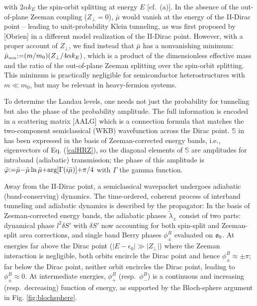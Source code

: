 \documentclass[aps, prb, showpacs, twocolumn, notitlepage, superscriptaddress]{revtex4-1}
\begin{document}
with $2\alpha k_E$ the spin-orbit splitting at energy $E$ [cf.\ (a)]. In the absence of the out-of-plane Zeeman coupling ($Z_\perp{=}0$), $\bar{\mu}$ would vanish at the energy of the II-Dirac point -- leading to unit-probability Klein tunneling, as was first proposed by [Obrien] in a different model realization of the II-Dirac point. However, with a proper account of $Z_\perp$, we find instead that $\bar{\mu}$ has a nonvanishing minimum: $\bar{\mu}_{\scriptscriptstyle{\text{min}}}{:}{=} ( m/m_0)(Z_\perp/4\alpha k_{E})$, which is a product of the dimensionless effective mass and the ratio of the out-of-plane Zeeman splitting over the spin-orbit splitting. This minimum is practically negligible for  semiconductor heterostructures with $m{\ll}m_0$, but may be relevant in heavy-fermion systems. 


To determine the Landau levels, one needs not just the probability for tunneling but also the phase of the probability amplitude. The full information is encoded in a scattering matrix [AALG]
which is a connection formula that matches the two-component semiclassical (WKB) wavefunction across the Dirac point. $\mathbb{S}$ in  has been expressed in the basis of Zeeman-corrected energy bands, i.e., eigenvectors of Eq. (\ref{calHRZ}), so the diagonal elements of $\mathbb{S}$ are amplitudes for intraband (adiabatic) transmission; the phase of this amplitude is $\bar{\varphi}{:}{=}\bar{\mu}{-}\bar{\mu}\ln\bar{\mu}{+}\text{arg}[\Gamma(i\bar{\mu})]{+}\pi/4$ with $\Gamma$ the gamma function.

Away from the II-Dirac point, a semiclassical wavepacket undergoes adiabatic (band-conserving) dynamics. The time-ordered, coherent process of interband tunneling and adiabatic dynamics is described by the propagator:
In the basis of Zeeman-corrected energy bands, the adiabatic phases $\tilde{\lambda}_{\pm}$ consist of two parts: dynamical phase $l^2 \delta S'$ with $\delta S'$ now accounting for both spin-split and Zeeman-split area corrections, and single band Berry phases $\phi^B_\pm$ evaluated on $\mathfrak{o}_0$. At energies far above the Dirac point ($|E{-}\epsilon_0|{\gg}|Z_{\perp}|$) where the Zeeman interaction is negligible, both orbits encircle the Dirac point and hence $\phi_{\pm}^B{\approx}{\pm}\pi$; far below the Dirac point, neither orbit encircles the Dirac point, leading to $\phi_{\pm}^B{\approx}0$. At intermediate energies, $\phi_{+}^B$ (resp.\ $\phi_{-}^B$) is a continuous and increasing (resp.\ decreasing) function of energy, as supported by the Bloch-sphere argument in Fig. \ref{fig:blochsphere}.
\end{document}
